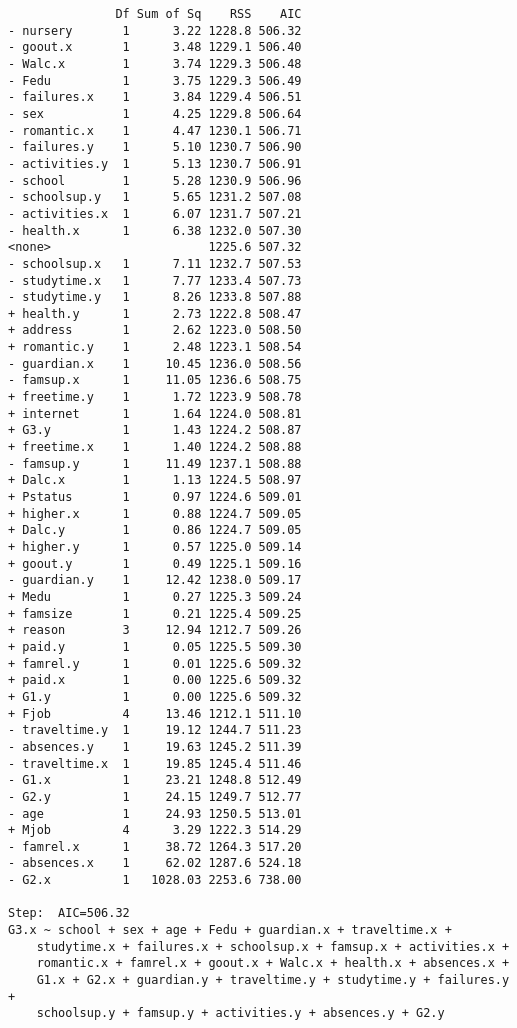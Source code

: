\documentclass[11pt]{article}
\begin{document}
\begin{enumerate}
\begin{verbatim}
               Df Sum of Sq    RSS    AIC
- nursery       1      3.22 1228.8 506.32
- goout.x       1      3.48 1229.1 506.40
- Walc.x        1      3.74 1229.3 506.48
- Fedu          1      3.75 1229.3 506.49
- failures.x    1      3.84 1229.4 506.51
- sex           1      4.25 1229.8 506.64
- romantic.x    1      4.47 1230.1 506.71
- failures.y    1      5.10 1230.7 506.90
- activities.y  1      5.13 1230.7 506.91
- school        1      5.28 1230.9 506.96
- schoolsup.y   1      5.65 1231.2 507.08
- activities.x  1      6.07 1231.7 507.21
- health.x      1      6.38 1232.0 507.30
<none>                      1225.6 507.32
- schoolsup.x   1      7.11 1232.7 507.53
- studytime.x   1      7.77 1233.4 507.73
- studytime.y   1      8.26 1233.8 507.88
+ health.y      1      2.73 1222.8 508.47
+ address       1      2.62 1223.0 508.50
+ romantic.y    1      2.48 1223.1 508.54
- guardian.x    1     10.45 1236.0 508.56
- famsup.x      1     11.05 1236.6 508.75
+ freetime.y    1      1.72 1223.9 508.78
+ internet      1      1.64 1224.0 508.81
+ G3.y          1      1.43 1224.2 508.87
+ freetime.x    1      1.40 1224.2 508.88
- famsup.y      1     11.49 1237.1 508.88
+ Dalc.x        1      1.13 1224.5 508.97
+ Pstatus       1      0.97 1224.6 509.01
+ higher.x      1      0.88 1224.7 509.05
+ Dalc.y        1      0.86 1224.7 509.05
+ higher.y      1      0.57 1225.0 509.14
+ goout.y       1      0.49 1225.1 509.16
- guardian.y    1     12.42 1238.0 509.17
+ Medu          1      0.27 1225.3 509.24
+ famsize       1      0.21 1225.4 509.25
+ reason        3     12.94 1212.7 509.26
+ paid.y        1      0.05 1225.5 509.30
+ famrel.y      1      0.01 1225.6 509.32
+ paid.x        1      0.00 1225.6 509.32
+ G1.y          1      0.00 1225.6 509.32
+ Fjob          4     13.46 1212.1 511.10
- traveltime.y  1     19.12 1244.7 511.23
- absences.y    1     19.63 1245.2 511.39
- traveltime.x  1     19.85 1245.4 511.46
- G1.x          1     23.21 1248.8 512.49
- G2.y          1     24.15 1249.7 512.77
- age           1     24.93 1250.5 513.01
+ Mjob          4      3.29 1222.3 514.29
- famrel.x      1     38.72 1264.3 517.20
- absences.x    1     62.02 1287.6 524.18
- G2.x          1   1028.03 2253.6 738.00

Step:  AIC=506.32
G3.x ~ school + sex + age + Fedu + guardian.x + traveltime.x + 
    studytime.x + failures.x + schoolsup.x + famsup.x + activities.x + 
    romantic.x + famrel.x + goout.x + Walc.x + health.x + absences.x + 
    G1.x + G2.x + guardian.y + traveltime.y + studytime.y + failures.y + 
    schoolsup.y + famsup.y + activities.y + absences.y + G2.y


\end{verbatim}
\end{enumerate}
\end{document}
